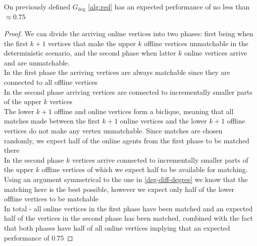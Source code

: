 \begin{lemma}
	On previously defined $G_{\deg}$ \autoref{alg:red} has an expected performance of no less than $\approx 0.75$
\end{lemma}
\begin{proof}
	We can divide the arriving online vertices into two phases: first being when the first $k+1$ vertices that make the upper $k$ offline vertices unmatchable in the deterministic scenario, and the second phase when latter $k$ online vertices arrive and are unmatchable.\\
	In the first phase the arriving vertices are always matchable since they are connected to all offline vertices\\
	In the second phase arriving vertices are connected to incrementally smaller parts of the upper $k$ vertices\\
	The lower $k+1$ offline and online vertices form a biclique, meaning that all matches made between the first $k+1$ online vertices and the lower $k+1$ offline vertices do not make any vertex unmatchable. Since matches are chosen randomly, we expect half of the online agents from the first phase to be matched there\\
	In the second phase $k$ vertices arrive connected to incrementally smaller parts of the upper $k$ offline vertices of which we expect half to be available for matching. Using an argument symmetrical to the one in \autoref{deg-diff-degree} we know that the matching here is the best possible, however we expect only half of the lower offline vertices to be matchable\\
	In total - all online vertices in the first phase have been matched and an expected half of the vertices in the second phase has been matched, combined with the fact that both phases have half of all online vertices implying that an expected performance of $0.75$
\end{proof}



